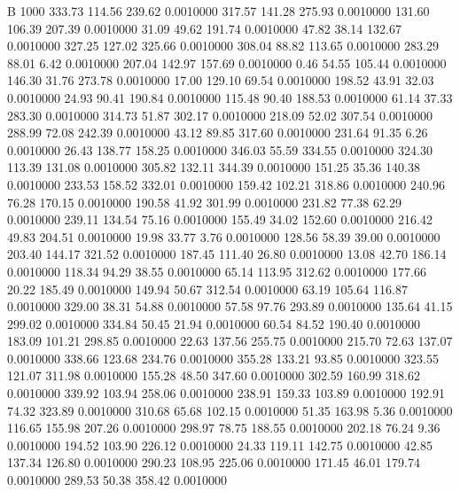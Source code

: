 


B 1000
 333.73  114.56  239.62   0.0010000
 317.57  141.28  275.93   0.0010000
 131.60  106.39  207.39   0.0010000
  31.09   49.62  191.74   0.0010000
  47.82   38.14  132.67   0.0010000
 327.25  127.02  325.66   0.0010000
 308.04   88.82  113.65   0.0010000
 283.29   88.01    6.42   0.0010000
 207.04  142.97  157.69   0.0010000
   0.46   54.55  105.44   0.0010000
 146.30   31.76  273.78   0.0010000
  17.00  129.10   69.54   0.0010000
 198.52   43.91   32.03   0.0010000
  24.93   90.41  190.84   0.0010000
 115.48   90.40  188.53   0.0010000
  61.14   37.33  283.30   0.0010000
 314.73   51.87  302.17   0.0010000
 218.09   52.02  307.54   0.0010000
 288.99   72.08  242.39   0.0010000
  43.12   89.85  317.60   0.0010000
 231.64   91.35    6.26   0.0010000
  26.43  138.77  158.25   0.0010000
 346.03   55.59  334.55   0.0010000
 324.30  113.39  131.08   0.0010000
 305.82  132.11  344.39   0.0010000
 151.25   35.36  140.38   0.0010000
 233.53  158.52  332.01   0.0010000
 159.42  102.21  318.86   0.0010000
 240.96   76.28  170.15   0.0010000
 190.58   41.92  301.99   0.0010000
 231.82   77.38   62.29   0.0010000
 239.11  134.54   75.16   0.0010000
 155.49   34.02  152.60   0.0010000
 216.42   49.83  204.51   0.0010000
  19.98   33.77    3.76   0.0010000
 128.56   58.39   39.00   0.0010000
 203.40  144.17  321.52   0.0010000
 187.45  111.40   26.80   0.0010000
  13.08   42.70  186.14   0.0010000
 118.34   94.29   38.55   0.0010000
  65.14  113.95  312.62   0.0010000
 177.66   20.22  185.49   0.0010000
 149.94   50.67  312.54   0.0010000
  63.19  105.64  116.87   0.0010000
 329.00   38.31   54.88   0.0010000
  57.58   97.76  293.89   0.0010000
 135.64   41.15  299.02   0.0010000
 334.84   50.45   21.94   0.0010000
  60.54   84.52  190.40   0.0010000
 183.09  101.21  298.85   0.0010000
  22.63  137.56  255.75   0.0010000
 215.70   72.63  137.07   0.0010000
 338.66  123.68  234.76   0.0010000
 355.28  133.21   93.85   0.0010000
 323.55  121.07  311.98   0.0010000
 155.28   48.50  347.60   0.0010000
 302.59  160.99  318.62   0.0010000
 339.92  103.94  258.06   0.0010000
 238.91  159.33  103.89   0.0010000
 192.91   74.32  323.89   0.0010000
 310.68   65.68  102.15   0.0010000
  51.35  163.98    5.36   0.0010000
 116.65  155.98  207.26   0.0010000
 298.97   78.75  188.55   0.0010000
 202.18   76.24    9.36   0.0010000
 194.52  103.90  226.12   0.0010000
  24.33  119.11  142.75   0.0010000
  42.85  137.34  126.80   0.0010000
 290.23  108.95  225.06   0.0010000
 171.45   46.01  179.74   0.0010000
 289.53   50.38  358.42   0.0010000
